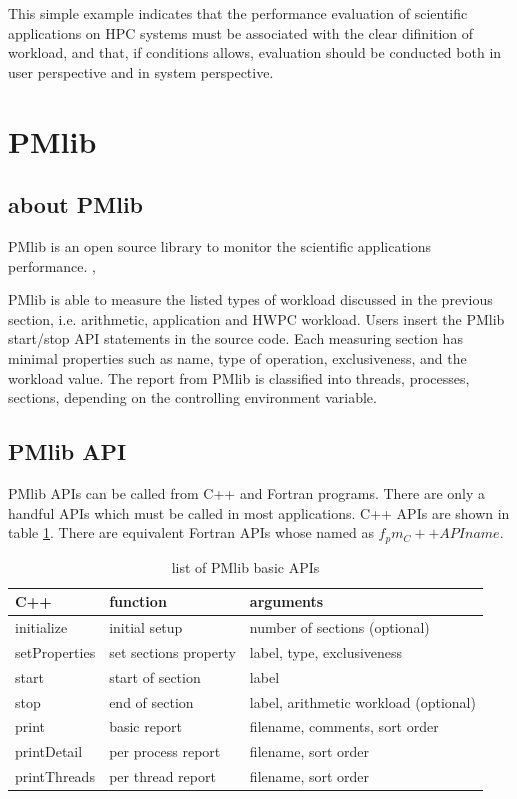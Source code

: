 \documentclass[conference]{IEEEtran}
\begin{document}
This simple example indicates that the performance evaluation of
scientific applications on HPC systems must be associated with the clear
difinition of workload, and that, if conditions allows, evaluation should be
conducted both in user perspective and in system perspective.

\section{PMlib}
\label{section:PMlib}

\subsection {about PMlib}

PMlib is an open source library to monitor the scientific applications
performance. 
\cite{PMlib:webpage-public},

PMlib is able to measure the listed types of workload discussed in the previous
section, i.e. arithmetic, application and HWPC workload.
Users insert the PMlib start/stop API statements in the source code.
Each measuring section has minimal properties such as name, type of operation,
exclusiveness, and the workload value.
The report from PMlib is classified into threads, processes, sections,
depending on the controlling environment variable.

\subsection{PMlib API}
\label{subsection:PMlib-API}

PMlib APIs can be called from C++ and Fortran programs.
There are only a handful APIs which must be called in most applications.
C++ APIs are shown in table \ref{tab:PMlib-API}. There are equivalent
Fortran APIs whose named as $ f_pm_C++API name $.

\begin{table}[tb]
\scriptsize
\caption{list of PMlib basic APIs}
\label{tab:PMlib-API}
\footnotesize
\begin{tabular}{l|l|l} \hline
\scriptsize
C++	& function	&	arguments	\\ \hline
\hline
initialize	& initial setup	& number of sections (optional)	\\ \hline
setProperties	& set sections property	& label, type, exclusiveness \\ \hline
start	& start of section	& label \\ \hline
stop	& end of section	& label, arithmetic workload (optional)	\\ \hline
print	& basic report	& filename, comments, sort order	\\ \hline
\hline
printDetail	& per process report	& filename, sort order	\\ \hline
printThreads	& per thread report	& filename, sort order	\\ \hline
\end{tabular}
\end{table}
\end{document}
